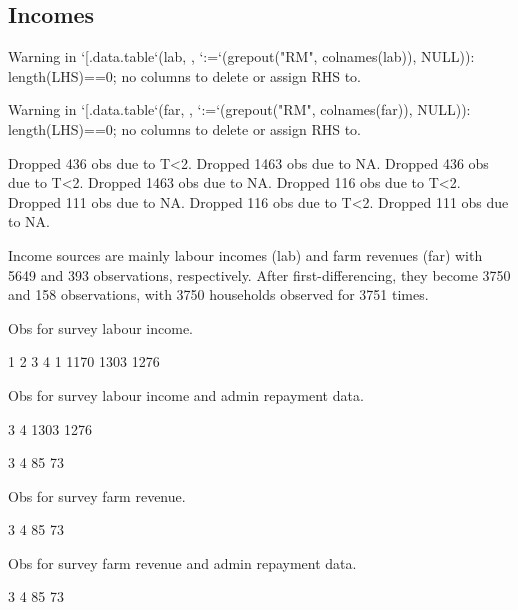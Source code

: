 \subsection{Incomes}



\begin{Schunk}
\begin{Soutput}
Warning in `[.data.table`(lab, , `:=`(grepout("RM", colnames(lab)), NULL)): length(LHS)==0; no columns to delete or assign RHS to.
\end{Soutput}
\begin{Soutput}
Warning in `[.data.table`(far, , `:=`(grepout("RM", colnames(far)), NULL)): length(LHS)==0; no columns to delete or assign RHS to.
\end{Soutput}
\begin{Soutput}
Dropped 436 obs due to T<2.
Dropped 1463 obs due to NA.
Dropped 436 obs due to T<2.
Dropped 1463 obs due to NA.
Dropped 116 obs due to T<2.
Dropped 111 obs due to NA.
Dropped 116 obs due to T<2.
Dropped 111 obs due to NA.
\end{Soutput}
\end{Schunk}

Income sources are mainly labour incomes (\textsf{lab}) and farm revenues (\textsf{far}) with 5649 and 393 observations, respectively. After first-differencing, they become 3750 and 158 observations, with 3750 households observed for 3751 times. 

Obs for survey labour income.
\begin{Schunk}
\begin{Soutput}

   1    2    3    4 
   1 1170 1303 1276 
\end{Soutput}
\end{Schunk}
Obs for survey labour income and admin repayment data.
\begin{Schunk}
\begin{Soutput}

   3    4 
1303 1276 
\end{Soutput}
\end{Schunk}
\begin{Schunk}
\begin{Soutput}

 3  4 
85 73 
\end{Soutput}
\end{Schunk}
Obs for survey farm revenue.
\begin{Schunk}
\begin{Soutput}

 3  4 
85 73 
\end{Soutput}
\end{Schunk}
Obs for survey farm revenue and admin repayment data.
\begin{Schunk}
\begin{Soutput}

 3  4 
85 73 
\end{Soutput}
\end{Schunk}

